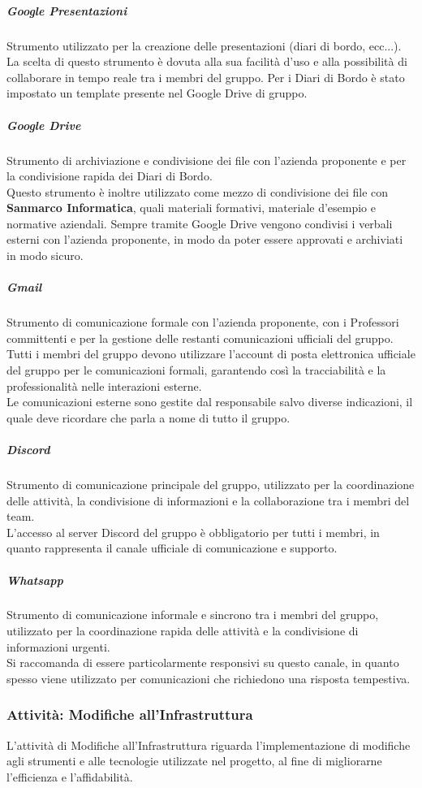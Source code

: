 \documentclass[a4paper,12pt]{article}
\begin{document}
\subparagraph{Google Presentazioni}
Strumento utilizzato per la creazione delle presentazioni (diari di bordo, ecc...). La scelta di questo
strumento è dovuta alla sua facilità d'uso e alla possibilità di collaborare in
tempo reale tra i membri del gruppo. Per i Diari di Bordo è stato impostato un
template presente nel Google Drive di gruppo.

\subparagraph{Google Drive}
Strumento di archiviazione e condivisione dei file con l'azienda proponente e
per la condivisione rapida dei Diari di Bordo. \\ Questo strumento è inoltre
utilizzato come mezzo di condivisione dei file con \textbf{Sanmarco
    Informatica}, quali materiali formativi, materiale d'esempio e normative
aziendali. Sempre tramite Google Drive vengono condivisi i verbali esterni con
l'azienda proponente, in modo da poter essere approvati e archiviati in modo
sicuro.

\subparagraph{Gmail}
Strumento di comunicazione formale con l'azienda proponente, con i Professori
committenti e per la gestione delle restanti comunicazioni ufficiali del
gruppo.\\ Tutti i membri del gruppo devono utilizzare l'account di posta
elettronica ufficiale del gruppo per le comunicazioni formali, garantendo così
la tracciabilità e la professionalità nelle interazioni esterne.\\ Le
comunicazioni esterne sono gestite dal responsabile salvo diverse indicazioni,
il quale deve ricordare che parla a nome di tutto il gruppo.

\subparagraph{Discord}
Strumento di comunicazione principale del gruppo, utilizzato per la
coordinazione delle attività, la condivisione di informazioni e la
collaborazione tra i membri del team.\\ L'accesso al server Discord del gruppo
è obbligatorio per tutti i membri, in quanto rappresenta il canale ufficiale di
comunicazione e supporto.

\subparagraph{Whatsapp}
Strumento di comunicazione informale e sincrono tra i membri del gruppo,
utilizzato per la coordinazione rapida delle attività e la condivisione di
informazioni urgenti.\\ Si raccomanda di essere particolarmente responsivi su
questo canale, in quanto spesso viene utilizzato per comunicazioni che
richiedono una risposta tempestiva.

\subsubsection{Attività: Modifiche all'Infrastruttura}
L'attività di Modifiche all'Infrastruttura riguarda l'implementazione di
modifiche agli strumenti e alle tecnologie utilizzate nel progetto, al fine di
migliorarne l'efficienza e l'affidabilità.
\end{document}
